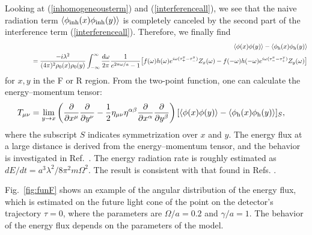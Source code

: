 \documentclass[aps,prd,preprintnumbers,nofootinbib,showpacs]{revtex4}%
\begin{document}
\begin{widetext}
Looking at (\ref{inhomogeneousterm}) and 
(\ref{interferenceall}),
we see that the naive radiation term $\langle\phi_{\rm inh}(x)\phi_{\rm inh}(y)\rangle$
is completely canceled by
the second part of the interference term (\ref{interferenceall}).
Therefore, we finally find 
\begin{eqnarray}
  &&\langle\phi(x)\phi(y)\rangle-\langle\phi_{\rm h}(x)\phi_{\rm h}(y)\rangle
\nonumber\\
  &&~~~~~~~~~~
={-i\lambda^2\over (4\pi)^2\rho_0(x)\rho_0(y)}
  \int _{-\infty}^{\infty}{d\omega\over2\pi}{1\over e^{2\pi\omega/a}-1}
\bigr[f(\omega)h(\omega)e^{i\omega(\tau_+^x-\tau_-^y)}Z_x(\omega)
-f(-\omega)h(-\omega)e^{i\omega(\tau_-^x-\tau_+^y)}Z_y(\omega)\bigl]
\nonumber\\
\label{interferencew}
\end{eqnarray}
for $x,y$ in the F or R region. 
%
From the two-point function, one can calculate the energy--momentum tensor:
\begin{eqnarray}
\hspace{-4mm}
T_{\mu\nu}
=\lim_{y\rightarrow x}\left({\partial\over \partial x^\mu }{\partial\over \partial y^\nu }-{1\over 2}
\eta_{\mu\nu}\eta^{\alpha\beta}{\partial\over \partial x^\alpha }{\partial\over \partial y^\beta }\right)
[\langle\phi(x)\phi(y)\rangle-\langle\phi_{\rm h}(x)\phi_{\rm h}(y)\rangle]_S,
\end{eqnarray} 
where the subscript $S$ indicates symmetrization over $x$ and $y$. 
The energy flux at a large distance is derived from the energy--momentum tensor, 
and the behavior is investigated in Ref.~\cite{IOTYZ}. 
The energy radiation rate is roughly estimated as $dE/dt=a^3\lambda^2/8\pi^2m\Omega^2$. 
The result is consistent with that found in Refs. \cite{LH,LH2}.

Fig.~\ref{fig:funF} shows an example of the angular distribution of the energy flux, 
which is estimated on the future light cone of the point on the detector's 
trajectory $\tau=0$, where the parameters are $\Omega/a=0.2$ and $\gamma/a=1$.  
The behavior of the energy flux depends on the parameters of the model. 





\end{widetext}
\end{document}
